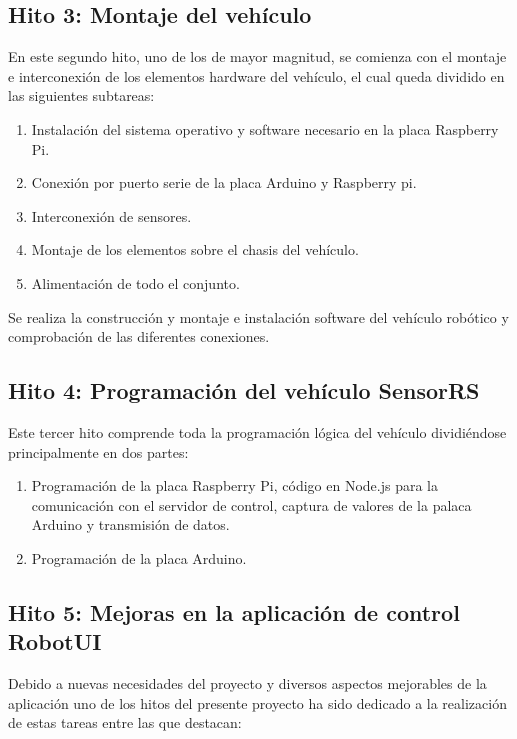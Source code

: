 \subsection{Hito 3: Montaje del vehículo}
\label{subsec:hito2}

En este segundo hito, uno de los de mayor magnitud, se comienza con el montaje e interconexión de los elementos hardware del vehículo, el cual queda dividido en las siguientes subtareas:\\

\begin{enumerate}
 \item Instalación del sistema operativo y software necesario en la placa Raspberry Pi.
 \item Conexión por puerto serie de la placa Arduino y Raspberry pi.
 \item Interconexión de sensores.
 \item Montaje de los elementos sobre el chasis del vehículo.
 \item Alimentación de todo el conjunto.
\end{enumerate}

Se realiza la construcción y montaje e instalación software del vehículo robótico y comprobación de las diferentes conexiones.

\subsection{Hito 4: Programación del vehículo SensorRS }
\label{subsec:hito3}

Este tercer hito comprende toda la programación lógica del vehículo dividiéndose principalmente en dos partes:

\begin{enumerate}
 \item Programación de la placa Raspberry Pi, código en Node.js para la comunicación con el servidor de control, captura de valores de la palaca Arduino y transmisión de datos.
 \item Programación de la placa Arduino.
\end{enumerate}

\subsection{Hito 5: Mejoras en la aplicación de control RobotUI }
\label{subsec:hito6}

Debido a nuevas necesidades del proyecto y diversos aspectos mejorables de la aplicación uno de los hitos del presente proyecto ha sido dedicado a la realización de estas tareas entre las que destacan:\\

